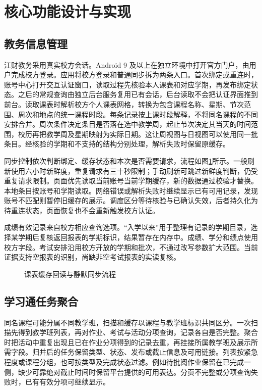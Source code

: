 \section{核心功能设计与实现}

\subsection{教务信息管理}
江财教务采用真实校方会话。Android 9 及以上在独立环境中打开官方门户，由用户完成校方登录。应用将校方登录和普通同步拆为两条入口。首次绑定或重连时，账号中心打开交互认证窗口，读取过程先核验本人课表和对应学期，再发布绑定状态。之后的常规查询由独立后台服务复用已有会话，后台读取不会把认证界面推到前台。读取课表时解析校方个人课表网格，转换为包含课程名称、星期、节次范围、周次和地点的统一课程时段。每条记录按上课时段解释，不将同名课程的不同安排合并。周次条件决定条目是否落在选中教学周，起止节次决定其当天的时间范围，校历再把教学周及星期映射为实际日期。这让周视图与日视图可以使用同一批条目。经核验的学期和不支持的结构分别处理，解析失败时保留原缓存。

同步控制依次判断绑定、缓存状态和本次是否需要请求，流程如图\ref{fig:jufe}所示。一般刷新使用六小时新鲜度，重复请求有三十秒限制；手动刷新可跳过新鲜度判断，仍受重复请求限制。页面优先读取当前账号当前学期缓存，新的数据通过校验才替换。本地条目按账号和学期读取。网络错误或解析失败时继续显示已有可用记录，发现账号不匹配则暂停旧缓存的展示。调度区分等待核验与已确认失效，后者持久化为待重连状态，页面恢复也不会重新触发校方认证。

成绩有效记录来自校方相应查询选项。“入学以来”用于整理有记录的学期目录，选择某学期后复核返回报表的学期标识，结果暂存在内存中。成绩、学分和绩点使用校方字段。考试安排沿用校方开放的学期和批次，不通过改写参数扩大范围。当前证据支持空报表的识别，尚缺非空考试报表的实读复核。

\begin{figure}[htbp]
\centering
\caption{课表缓存回读与静默同步流程}\label{fig:jufe}
\end{figure}

\subsection{学习通任务聚合}
同名课程可能分属不同教学班，扫描和缓存以课程与教学班标识共同区分。一次扫描先得到教学班列表，再对作业、考试与活动分项查询，记录各自是否完整。聚合时把活动中重复出现且已在作业分项得到的记录去重，再挂接所属教学班及展示所需字段。归并后的任务保留类型、状态、发布或截止信息及可用链接。列表按紧急程度或课程分组，也可按类型及完成状态过滤。例如待批阅作业保留在已完成一侧，缺少可靠绝对截止时间时保留平台提供的可用表达。分页不完整或分项查询失败时，已有有效分项可继续显示。


